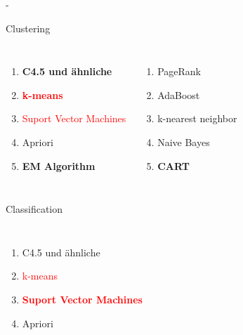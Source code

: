\documentclass[fleqn,11pt,aspectratio=43]{beamer}
\begin{document}
\begin{frame}{\insertsectionhead - \insertsubsectionhead \cite{wu2008top}}
\small
\vspace{-0.6em}
\begin{block}{\vspace{-0.2em}Clustering\vspace{-0.2em}}
\vspace{-1.5em}
\begin{columns}[onlytextwidth]
		\begin{enumerate}[label=\bfseries\arabic*.]
		\setlength{\itemsep}{-5pt}
		\item \textbf{C4.5 und ähnliche}
		\item \textbf{\textcolor{red}{k-means}}
		\item \textcolor{red}{Suport Vector Machines}
		\item Apriori
		\item \textbf{EM Algorithm}
		\end{enumerate}
	    \begin{enumerate}[label=\bfseries\arabic*.]
	    \setlength{\itemsep}{-5pt}
	    \setcounter{enumi}{5}
	    \item PageRank
	    \item AdaBoost
	    \item k-nearest neighbor
	    \item Naive Bayes
	    \item \textbf{CART}
	    \end{enumerate}
\end{columns}
\vspace{-0.3em}
\end{block}
\pause
\vspace{-0.4em}
\begin{block}{\vspace{-0.2em}Classification\vspace{-0.2em}}
\vspace{-1.5em}
\begin{columns}[onlytextwidth]
		\begin{enumerate}[label=\bfseries\arabic*.]
		\setlength{\itemsep}{-5pt}
		\item C4.5 und ähnliche
		\item \textcolor{red}{k-means}
		\item \textbf{\textcolor{red}{Suport Vector Machines}}
		\item Apriori

\end{enumerate}
\end{columns}
\end{block}
\end{frame}
\end{document}
